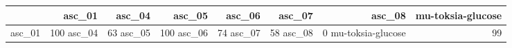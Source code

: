 \begin{tabular}{lrrrrrrr}
\toprule
 & asc_01 & asc_04 & asc_05 & asc_06 & asc_07 & asc_08 & mu-toksia-glucose \\
\midrule
asc_01 & 100%
asc_04 & 63%
asc_05 & 100%
asc_06 & 74%
asc_07 & 58%
asc_08 & 0%
mu-toksia-glucose & 99%
\bottomrule
\end{tabular}
